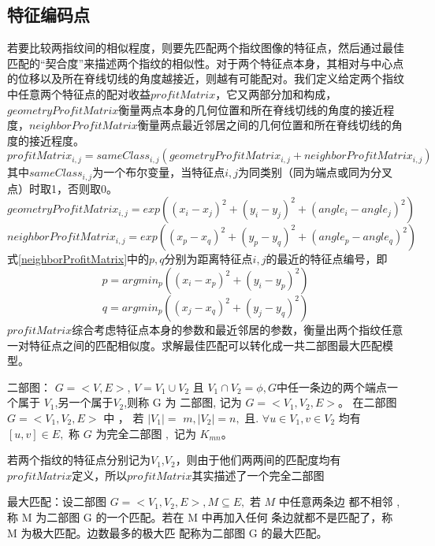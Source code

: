 \documentclass[withoutpreface,bwprint]{cumcmthesis} %
\begin{document}
\subsection{特征编码点}
若要比较两指纹间的相似程度，则要先匹配两个指纹图像的特征点，然后通过最佳匹配的“契合度”来描述两个指纹的相似性。对于两个特征点本身，其相对与中心点的位移以及所在脊线切线的角度越接近，则越有可能配对。我们定义给定两个指纹中任意两个特征点的配对收益$profitMatrix$，它又两部分加和构成，$geometryProfitMatrix$衡量两点本身的几何位置和所在脊线切线的角度的接近程度，$neighborProfitMatrix$衡量两点最近邻居之间的几何位置和所在脊线切线的角度的接近程度。
\begin{equation}
\label{profitMatrix}
profitMatrix_{i,j}=sameClass_{i,j}(geometryProfitMatrix_{i,j}+neighborProfitMatrix_{i,j})
\end{equation}
其中$sameClass_{i,j}$为一个布尔变量，当特征点$i, j$为同类别（同为端点或同为分叉点）时取1，否则取0。
\begin{equation}
\label{geometryProfitMatrix}
geometryProfitMatrix_{i,j}=exp((x_i-x_j)^2+(y_i-y_j)^2+(angle_i-angle_j)^2)
\end{equation}
\begin{equation}
\label{neighborProfitMatrix}
neighborProfitMatrix_{i,j}=exp((x_p-x_q)^2+(y_p-y_q)^2+(angle_p-angle_q)^2)
\end{equation}
式\ref{neighborProfitMatrix}中的$p, q$分别为距离特征点$i, j$的最近的特征点编号，即
$$
p=argmin_p ((x_i-x_p)^2+(y_i-y_p)^2)
$$
$$
q=argmin_p ((x_j-x_q)^2+(y_j-y_q)^2)
$$
$profitMatrix$综合考虑特征点本身的参数和最近邻居的参数，衡量出两个指纹任意一对特征点之间的匹配相似度。求解最佳匹配可以转化成一共二部图最大匹配模型。

\begin{definition}
	二部图： $G =< V , E >$, $V = V _{1} \cup V _{2}$ 且 $V _{1} \cap V _{2}=\phi, G$中任一条边的两个端点一个属于 $V_1$,另一个属于$V_2$,则称 G 为 二部图, 记为 $G =< V _{1}, V _{2}, E >$。 在二部图 $G =< V _{1}, V _{2}, E >$ 中 ， 若 $\left| V _{1}\right|=$
$m ,\left| V _{2}\right|= n ,$ 且. $\forall u \in V _{1}, v \in V _{2}$ 均有 $[ u , v ] \in E ,$ 称 $G$ 为完全二部图 $,$ 记为 $K _{ mn }$。
\end{definition}

若两个指纹的特征点分别记为$V_1$,$V_2$，则由于他们两两间的匹配度均有$profitMatrix$定义，所以$profitMatrix$其实描述了一个完全二部图

\begin{definition}
	最大匹配：设二部图 $G=<V_{1}, V_{2}, E>, M \subseteq E,$ 若 $M$ 中任意两条边 都不相邻 ,称 M 为二部图 G 的一个匹配。若在 M 中再加入任何 条边就都不是匹配了，称 M 为极大匹配。边数最多的极大匹 配称为二部图 G 的最大匹配。
\end{definition}
\end{document}
